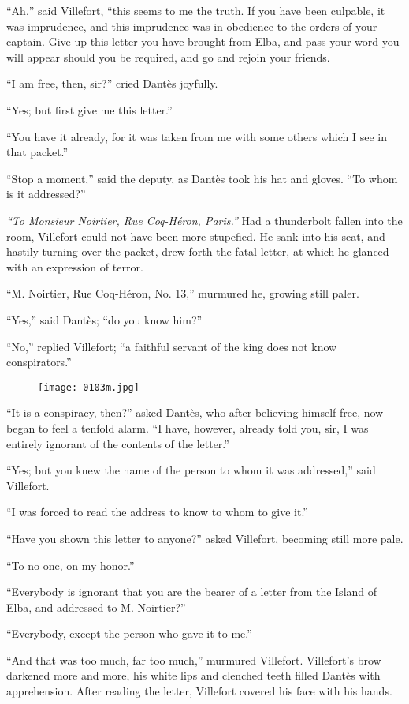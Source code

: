 “Ah,” said Villefort, “this seems to me the truth. If you have been
culpable, it was imprudence, and this imprudence was in obedience to
the orders of your captain. Give up this letter you have brought from
Elba, and pass your word you will appear should you be required, and go
and rejoin your friends.

“I am free, then, sir?” cried Dantès joyfully.

“Yes; but first give me this letter.”

“You have it already, for it was taken from me with some others which I
see in that packet.”

“Stop a moment,” said the deputy, as Dantès took his hat and gloves.
“To whom is it addressed?”

\textit{“To Monsieur Noirtier, Rue Coq-Héron, Paris.”} Had a thunderbolt
fallen into the room, Villefort could not have been more stupefied. He
sank into his seat, and hastily turning over the packet, drew forth the
fatal letter, at which he glanced with an expression of terror.

“M. Noirtier, Rue Coq-Héron, No. 13,” murmured he, growing still paler.

“Yes,” said Dantès; “do you know him?”

“No,” replied Villefort; “a faithful servant of the king does not know
conspirators.”

\begin{figure}[ht]
\texttt{[image: 0103m.jpg]}
\end{figure}

“It is a conspiracy, then?” asked Dantès, who after believing himself
free, now began to feel a tenfold alarm. “I have, however, already told
you, sir, I was entirely ignorant of the contents of the letter.”

“Yes; but you knew the name of the person to whom it was addressed,”
said Villefort.

“I was forced to read the address to know to whom to give it.”

“Have you shown this letter to anyone?” asked Villefort, becoming still
more pale.

“To no one, on my honor.”

“Everybody is ignorant that you are the bearer of a letter from the
Island of Elba, and addressed to M. Noirtier?”

“Everybody, except the person who gave it to me.”

“And that was too much, far too much,” murmured Villefort. Villefort’s
brow darkened more and more, his white lips and clenched teeth filled
Dantès with apprehension. After reading the letter, Villefort covered
his face with his hands.

